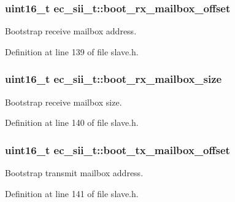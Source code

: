 \subsubsection[{boot\-\_\-rx\-\_\-mailbox\-\_\-offset}]{\setlength{\rightskip}{0pt plus 5cm}uint16\-\_\-t {\bf ec\-\_\-sii\-\_\-t\-::boot\-\_\-rx\-\_\-mailbox\-\_\-offset}}\label{structec__sii__t_abdcbea468841ca94492bae78207b1282}


\-Bootstrap receive mailbox address. 



\-Definition at line 139 of file slave.\-h.

\subsubsection[{boot\-\_\-rx\-\_\-mailbox\-\_\-size}]{\setlength{\rightskip}{0pt plus 5cm}uint16\-\_\-t {\bf ec\-\_\-sii\-\_\-t\-::boot\-\_\-rx\-\_\-mailbox\-\_\-size}}\label{structec__sii__t_aa5e4828a5bb2ea45194de12fe48608ed}


\-Bootstrap receive mailbox size. 



\-Definition at line 140 of file slave.\-h.

\subsubsection[{boot\-\_\-tx\-\_\-mailbox\-\_\-offset}]{\setlength{\rightskip}{0pt plus 5cm}uint16\-\_\-t {\bf ec\-\_\-sii\-\_\-t\-::boot\-\_\-tx\-\_\-mailbox\-\_\-offset}}\label{structec__sii__t_a91d2fc76e5e4b634e130aa9e51e71bfc}


\-Bootstrap transmit mailbox address. 



\-Definition at line 141 of file slave.\-h.

